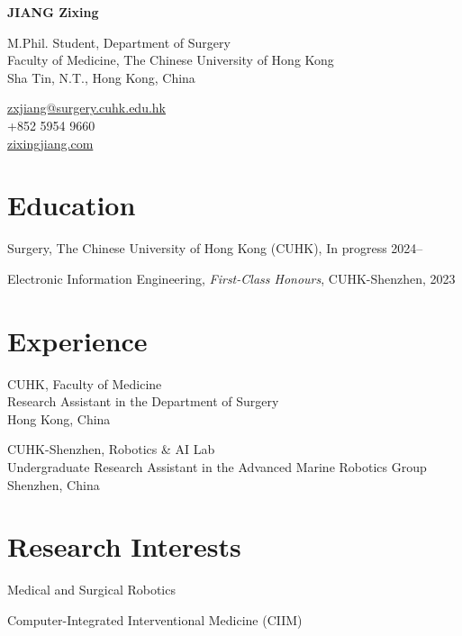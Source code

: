\documentclass[11pt,letterpaper]{report}
\newcommand{\myname}{JIANG Zixing}
\newcommand{\namefont}[1]{{\normalfont\bfseries\Huge{#1}}}
\newcommand{\listitemspace}{0.25em}
\renewenvironment{itemize}
{\begin{list}{}{\setlength{\leftmargin}{0em}
			\setlength{\parskip}{0em}
			\setlength{\itemsep}{\listitemspace}
			\setlength{\parsep}{\listitemspace}}}
	{\end{list}}
\begin{document}
	\raggedright{}
	
	
\namefont{\myname}

\vspace{1em}
\begin{minipage}[t]{0.64\textwidth}
	M.Phil. Student, Department of Surgery \\
	Faculty of Medicine, The Chinese University of Hong Kong\\
	Sha Tin, N.T., Hong Kong, China
\end{minipage}\hfill
\begin{minipage}[t]{0.29\textwidth}
	{\scriptsize \faEnvelope} \href{mailto:zxjiang@surgery.cuhk.edu.hk}{zxjiang@surgery.cuhk.edu.hk} \\
	{\scriptsize \faPhone} +852 5954 9660 \\
	{\scriptsize \faHome} \href{https://zixingjiang.com/}{zixingjiang.com}
\end{minipage}

\section*{Education}
\begin{tablist}
	\item[M.Phil.]  \tab Surgery, The Chinese University of Hong Kong (CUHK), In progress 2024--\\
	\item[B.Eng.]  \tab Electronic Information Engineering, \textit{First-Class Honours}, CUHK-Shenzhen, 2023
\end{tablist}

\section*{Experience}	
\begin{tablist}
	\item[2023--24] \tab CUHK, Faculty of Medicine\\ 
	Research Assistant in the Department of Surgery\\
	Hong Kong, China
	
	\item[2020--23] \tab CUHK-Shenzhen, Robotics \& AI Lab\\ 
	Undergraduate Research Assistant in the Advanced Marine Robotics Group\\
	Shenzhen, China
\end{tablist}

\section*{Research Interests} 
\begin{itemize}
	\item Medical and Surgical Robotics
	\item Computer-Integrated Interventional Medicine (CIIM) 
\end{itemize}
\end{document}
